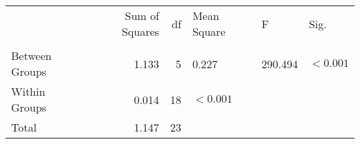 \begin{tabular}{lrrlll}
\toprule
 & Sum of Squares & df & Mean Square & F & Sig. \\
 &  &  &  &  &  \\
\midrule
Between Groups & 1.133 & 5 & 0.227 & 290.494 & $< 0.001$ \\
Within Groups & 0.014 & 18 & $< 0.001$ &  &  \\
Total & 1.147 & 23 &  &  &  \\
\bottomrule
\end{tabular}
